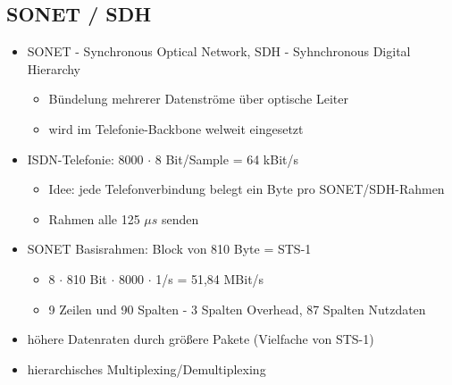 \subsection{SONET / SDH}
\begin{itemize}
	\item SONET - Synchronous Optical Network, SDH - Syhnchronous Digital Hierarchy
	\begin{itemize}
		\item Bündelung mehrerer Datenströme über optische Leiter
		\item wird im Telefonie-Backbone welweit eingesetzt
	\end{itemize}
	\item ISDN-Telefonie: 8000 \(\cdot\) 8 Bit/Sample = 64 kBit/s
	\begin{itemize}
		\item Idee: jede Telefonverbindung belegt ein Byte pro SONET/SDH-Rahmen
		\item Rahmen alle 125 \(\mu s\) senden
	\end{itemize}
	\item SONET Basisrahmen: Block von 810 Byte = STS-1 
	\begin{itemize}
		\item 8 \(\cdot\) 810 Bit \(\cdot\) 8000 \(\cdot\) 1/s = 51,84 MBit/s
		\item 9 Zeilen und 90 Spalten - 3 Spalten Overhead, 87 Spalten Nutzdaten
	\end{itemize}
	\item höhere Datenraten durch größere Pakete (Vielfache von STS-1)
	\item hierarchisches Multiplexing/Demultiplexing
\end{itemize}
